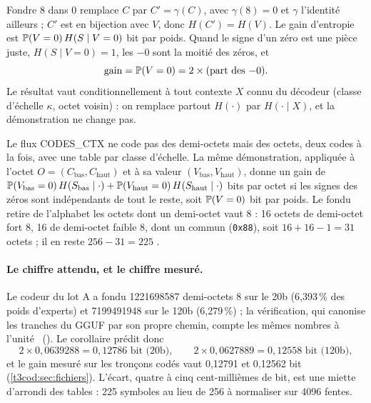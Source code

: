 \begin{corollaire}\label{t3cod:cor:gain}
Fondre 8 dans 0 remplace $C$ par $C' = \gamma(C)$, avec $\gamma(8) = 0$ et $\gamma$ l'identité ailleurs ; $C'$ est en bijection avec $V$, donc $H(C') = H(V)$. Le gain d'entropie est $\mathbb{P}(V = 0)\,H(S \mid V = 0)$ bit par poids. Quand le signe d'un zéro est une pièce juste, $H(S \mid V = 0) = 1$, les $-0$ sont la moitié des zéros, et
\begin{equation}\label{t3cod:eq:deux-fois}
\text{gain} = \mathbb{P}(V = 0) = 2 \times \text{(part des } {-0}\text{)}.
\end{equation}
Le résultat vaut conditionnellement à tout contexte $X$ connu du décodeur (classe d'échelle $\kappa$, octet voisin) : on remplace partout $H(\cdot)$ par $H(\cdot \mid X)$, et la démonstration ne change pas.
\end{corollaire}

\begin{remarque}\label{t3cod:rem:octet}
Le flux CODES\_CTX ne code pas des demi-octets mais des octets, deux codes à la fois, avec une table par classe d'échelle. La même démonstration, appliquée à l'octet $O = (C_{\text{bas}}, C_{\text{haut}})$ et à sa valeur $(V_{\text{bas}}, V_{\text{haut}})$, donne un gain de $\mathbb{P}(V_{\text{bas}} = 0)\,H(S_{\text{bas}} \mid \cdot) + \mathbb{P}(V_{\text{haut}} = 0)\,H(S_{\text{haut}} \mid \cdot)$ bits par octet si les signes des zéros sont indépendants de tout le reste, soit $\mathbb{P}(V = 0)$ bit par poids. Le fondu retire de l'alphabet les octets dont un demi-octet vaut 8 : 16 octets de demi-octet fort 8, 16 de demi-octet faible 8, dont un commun (\texttt{0x88}), soit $16 + 16 - 1 = 31$ octets ; il en reste $256 - 31 = 225$ \calc.
\end{remarque}

\paragraph{Le chiffre attendu, et le chiffre mesuré.} Le codeur du lot A a fondu \num{1221698587} demi-octets 8 sur le 20b (6,393\,\% des poids d'experts) et \num{7199491948} sur le 120b (6,279\,\%) ; la vérification, qui canonise les tranches du GGUF par son propre chemin, compte les mêmes nombres à l'unité \mes~(). Le corollaire prédit donc \calc
\[
2 \times 0{,}0639288 = 0{,}12786 \text{ bit (20b)}, \qquad 2 \times 0{,}0627889 = 0{,}12558 \text{ bit (120b)},
\]
et le gain mesuré sur les tronçons codés vaut 0,12791 et 0,12562 bit (\cref{t3cod:sec:fichiers}). L'écart, quatre à cinq cent-millièmes de bit, est une miette d'arrondi des tables : 225 symboles au lieu de 256 à normaliser sur \num{4096} fentes.

